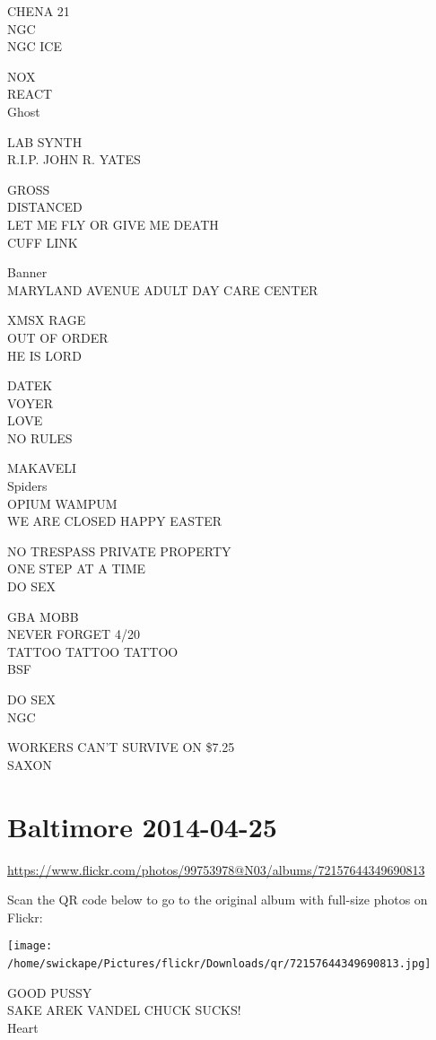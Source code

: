 \documentclass[10pt,letterpaper]{article}
\begin{document}
CHENA 21\\
NGC\\
NGC ICE

NOX\\
REACT\\
Ghost

LAB SYNTH\\
R.I.P. JOHN R. YATES

GROSS\\
DISTANCED\\
LET ME FLY OR GIVE ME DEATH\\
CUFF LINK

Banner\\
MARYLAND AVENUE ADULT DAY CARE CENTER

XMSX RAGE\\
OUT OF ORDER\\
HE IS LORD

DATEK\\
VOYER\\
LOVE\\
NO RULES

MAKAVELI\\
Spiders\\
OPIUM WAMPUM\\
WE ARE CLOSED HAPPY EASTER

NO TRESPASS PRIVATE PROPERTY\\
ONE STEP AT A TIME\\
DO SEX

GBA MOBB\\
NEVER FORGET 4/20\\
TATTOO TATTOO TATTOO\\
BSF

DO SEX\\
NGC

WORKERS CAN'T SURVIVE ON \$7.25\\
SAXON
\

\section*{Baltimore 2014-04-25}

\url{https://www.flickr.com/photos/99753978@N03/albums/72157644349690813}

Scan the QR code below to go to the original album with full-size photos on Flickr:

\texttt{[image: /home/swickape/Pictures/flickr/Downloads/qr/72157644349690813.jpg]}
\

GOOD PUSSY\\
SAKE AREK VANDEL CHUCK SUCKS!\\
Heart
\end{document}
